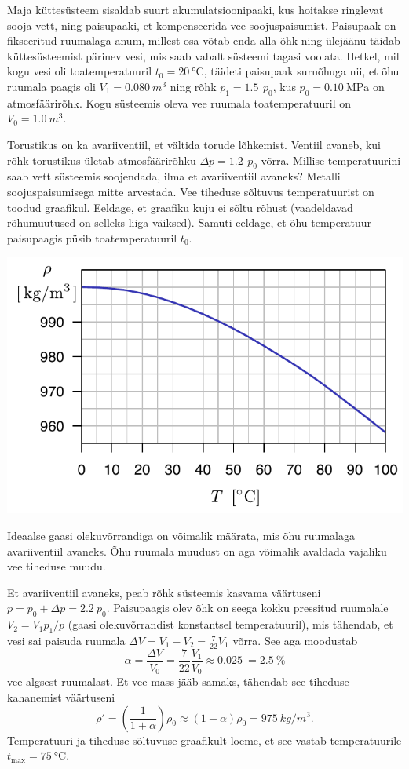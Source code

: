 
Maja küttesüsteem sisaldab suurt akumulatsioonipaaki, kus hoitakse ringlevat sooja vett, ning paisupaaki, et kompenseerida vee soojuspaisumist. Paisupaak on fikseeritud ruumalaga anum, millest osa võtab enda alla õhk ning ülejäänu täidab küttesüsteemist pärinev vesi, mis saab vabalt süsteemi tagasi voolata. Hetkel, mil kogu vesi oli toatemperatuuril $t_0=\SI{20}{\degreeCelsius}$, täideti paisupaak suruõhuga nii, et õhu ruumala paagis oli $V_1=\SI{0.080}{m^3}$ ning rõhk $p_1=\SI{1.5}{}\,p_0$, kus $p_0=\SI{0.10}{\mega\pascal}$ on atmosfäärirõhk. Kogu süsteemis oleva vee ruumala toatemperatuuril on $V_0=\SI{1.0}{m^3}$.

Torustikus on ka avariiventiil, et vältida torude lõhkemist. Ventiil avaneb, kui rõhk torustikus ületab atmosfäärirõhku $\Delta p = \SI{1.2}{} \, p_0 $ võrra. Millise temperatuurini saab vett süsteemis soojendada, ilma et avariiventiil avaneks? Metalli soojuspaisumisega mitte arvestada. Vee tiheduse sõltuvus temperatuurist on toodud graafikul. Eeldage, et graafiku kuju ei sõltu rõhust (vaadeldavad rõhumuutused on selleks liiga väiksed). Samuti eeldage, et õhu temperatuur paisupaagis püsib toatemperatuuril $t_0$.

\begin{center}
\includegraphics[width=0.8\linewidth]{2014-v3g-03-veeTihedus}
\end{center}

\hint
Ideaalse gaasi olekuvõrrandiga on võimalik määrata, mis õhu ruumalaga avariiventiil avaneks. Õhu ruumala muudust on aga võimalik avaldada vajaliku vee tiheduse muudu.

\solu
Et avariiventiil avaneks, peab rõhk süsteemis kasvama väärtuseni $p=p_0+\Delta p = \SI{2.2}{}p_0$. Paisupaagis olev õhk on seega kokku pressitud ruumalale $V_2=V_1 p_1/p$ (gaasi olekuvõrrandist konstantsel temperatuuril), mis tähendab, et vesi sai paisuda ruumala $\Delta V = V_1-V_2 = \frac{7}{22}V_1$ võrra. See aga moodustab \[\alpha = \frac{\Delta V}{V_0}= \frac{7}{22}\frac{V_1}{V_0}\approx \SI{0.025}{} = \SI{2.5}{}\%\] vee algsest ruumalast. Et vee mass jääb samaks, tähendab see tiheduse kahanemist väärtuseni \[\rho'=\left(\frac{1}{1+\alpha}\right)\rho_0\approx(1-\alpha)\rho_0= \SI{975}{kg/m^3}.\]
Temperatuuri ja tiheduse sõltuvuse graafikult loeme, et see vastab temperatuurile $t_\text{max}=\SI{75}{\degreeCelsius}$.

